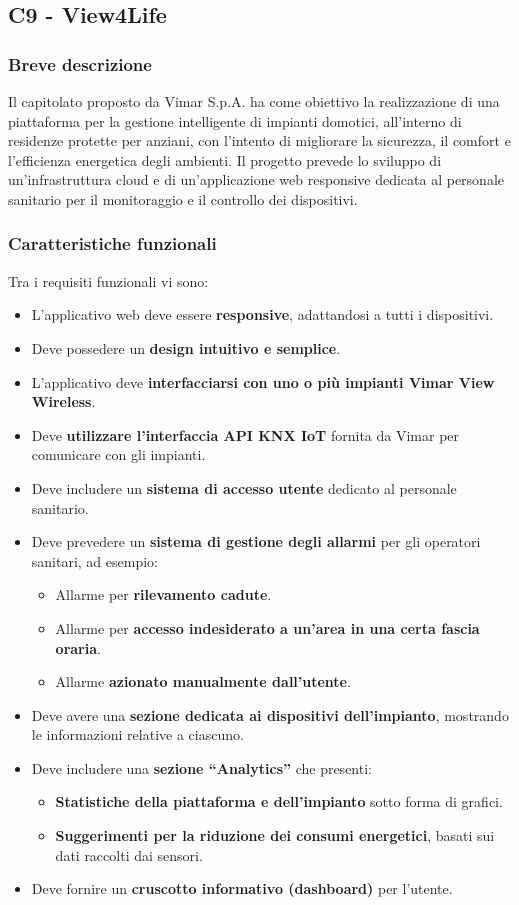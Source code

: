 \documentclass[a4paper,11pt]{article}
\begin{document}
\newpage
\subsection{C9 - View4Life}
\subsubsection{Breve descrizione}
\parbox[t]{\linewidth}{%
Il capitolato proposto da Vimar S.p.A. ha come obiettivo la realizzazione di una piattaforma per la gestione intelligente di impianti domotici, all'interno di residenze protette per anziani, con l'intento di migliorare la sicurezza, il comfort e l'efficienza energetica degli ambienti. Il progetto prevede lo sviluppo di un'infrastruttura cloud e di un'applicazione web responsive dedicata al personale sanitario per il monitoraggio e il controllo dei dispositivi.
}
\subsubsection{Caratteristiche funzionali}
Tra i requisiti funzionali vi sono:
\begin{itemize}
    \item L'applicativo web deve essere \textbf{responsive}, adattandosi a tutti i dispositivi.
    \item Deve possedere un \textbf{design intuitivo e semplice}.
    \item L'applicativo deve \textbf{interfacciarsi con uno o più impianti Vimar View Wireless}.
    \item Deve \textbf{utilizzare l'interfaccia API KNX IoT} fornita da Vimar per comunicare con gli impianti.
    \item Deve includere un \textbf{sistema di accesso utente} dedicato al personale sanitario.
    \item Deve prevedere un \textbf{sistema di gestione degli allarmi} per gli operatori sanitari, ad esempio:
    \begin{itemize}
        \item Allarme per \textbf{rilevamento cadute}.
        \item Allarme per \textbf{accesso indesiderato a un'area in una certa fascia oraria}.
        \item Allarme \textbf{azionato manualmente dall'utente}.
    \end{itemize}
    \item Deve avere una \textbf{sezione dedicata ai dispositivi dell'impianto}, mostrando le informazioni relative a ciascuno.
    \item Deve includere una \textbf{sezione ``Analytics''} che presenti:
    \begin{itemize}
        \item \textbf{Statistiche della piattaforma e dell'impianto} sotto forma di grafici.
        \item \textbf{Suggerimenti per la riduzione dei consumi energetici}, basati sui dati raccolti dai sensori.
    \end{itemize}
    \item Deve fornire un \textbf{cruscotto informativo (dashboard)} per l'utente.
\end{itemize}
\end{document}
